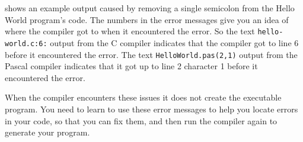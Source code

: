  shows an example output caused by removing a single semicolon from the Hello World program's code. The numbers in the error messages give you an idea of where the compiler got to when it encountered the error. So the text \texttt{hello-world.c:6:} output from the C compiler indicates that the compiler got to line 6 before it encountered the error. The text \texttt{HelloWorld.pas(2,1)} output from the Pascal compiler indicates that it got up to line 2 character 1 before it encountered the error.

When the compiler encounters these issues it does not create the executable program. You need to learn to use these error messages to help you locate errors in your code, so that you can fix them, and then run the compiler again to generate your program.





